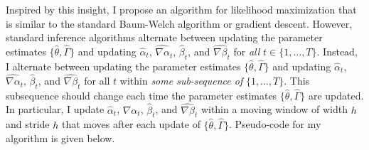Inspired by this insight, I propose an algorithm for likelihood maximization that is similar to the standard Baum-Welch algorithm or gradient descent. However, standard inference algorithms alternate between updating the parameter estimates $\{\hat \theta, \hat \Gamma\}$ and updating $\hat \alpha_t$, $\widehat{\nabla \alpha}_t$, $\hat \beta_t$, and $\widehat{\nabla \beta}_t$ for \textit{all} $t \in \{1,\ldots,T\}$. Instead, I alternate between updating the parameter estimates $\{\hat \theta, \hat \Gamma\}$ and updating $\hat \alpha_t$, $\widehat{\nabla \alpha}_t$, $\hat \beta_t$, and $\widehat{\nabla \beta}_t$ for all $t$ within \textit{some sub-sequence of} $\{1,\ldots,T\}$. This subsequence should change each time the parameter estimates $\{\hat \theta, \hat \Gamma\}$ are updated. In particular, I update $\hat \alpha_t$, $\widehat{\nabla \alpha}_t$, $\hat \beta_t$, and $\widehat{\nabla \beta}_t$ within a moving window of width $h$ and stride $h$ that moves after each update of $\{\hat \theta, \hat \Gamma\}$. Pseudo-code for my algorithm is given below.
%
